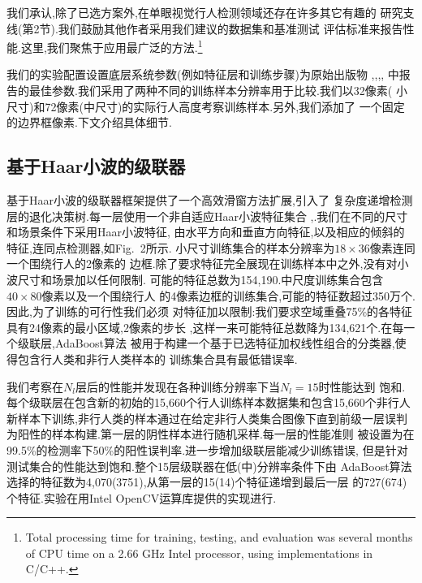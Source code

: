 \documentclass[10pt,letterpaper,journal,compsoc]{IEEEtran}
\begin{document}
我们承认,除了已选方案外,在单眼视觉行人检测领域还存在许多其它有趣的
研究支线(第2节).我们鼓励其他作者采用我们建议的数据集和基准测试
评估标准来报告性能.这里,我们聚焦于应用最广泛的方法.\footnote{
Total processing time for training, testing, and evaluation was several
months of CPU time on a 2.66 GHz Intel processor, using implementations
in C/C++.}

我们的实验配置设置底层系统参数(例如特征层和训练步骤)为原始出版物
\cite{bib11},\cite{bib23},\cite{bib49},\cite{bib74},\cite{bib75}
中报告的最佳参数.我们采用了两种不同的训练样本分辨率用于比较.我们以32像素(
小尺寸)和72像素(中尺寸)的实际行人高度考察训练样本.另外,我们添加了
一个固定的边界框像素.下文介绍具体细节.
\subsection{基于Haar小波的级联器}
基于Haar小波的级联器框架\cite{bib74}提供了一个高效滑窗方法扩展,引入了
复杂度递增检测层的退化决策树.每一层使用一个非自适应Haar小波特征集合
\cite{bib48},\cite{bib53}.我们在不同的尺寸和场景条件下采用Haar小波特征,
由水平方向和垂直方向特征,以及相应的倾斜的特征,连同点检测器,如Fig.~2所示.
小尺寸训练集合的样本分辨率为$18\times36$像素连同一个围绕行人的2像素的
边框.除了要求特征完全展现在训练样本中之外,没有对小波尺寸和场景加以任何限制.
可能的特征总数为154,190.中尺度训练集合包含$40\times80$像素以及一个围绕行人
的4像素边框的训练集合,可能的特征数超过350万个.因此,为了训练的可行性我们必须
对特征加以限制:我们要求空域重叠75\%的各特征具有24像素的最小区域,2像素的步长
,这样一来可能特征总数降为134,621个.在每一个级联层,AdaBoost算法\cite{bib18}
被用于构建一个基于已选特征加权线性组合的分类器,使得包含行人类和非行人类样本的
训练集合具有最低错误率.

我们考察在$N_l$层后的性能并发现在各种训练分辨率下当$N_l=15$时性能达到
饱和.每个级联层在包含新的初始的15,660个行人训练样本数据集和包含15,660个非行人
新样本下训练,非行人类的样本通过在给定非行人类集合图像下直到前级一层误判
为阳性的样本构建.第一层的阴性样本进行随机采样.每一层的性能准则
被设置为在99.5\%的检测率下50\%的阳性误判率.进一步增加级联层能减少训练错误,
但是针对测试集合的性能达到饱和.整个15层级联器在低(中)分辨率条件下由
AdaBoost算法选择的特征数为4,070(3751),从第一层的15(14)个特征递增到最后一层
的727(674)个特征.实验在用Intel OpenCV运算库\cite{bib29}提供的实现进行.
\end{document}
